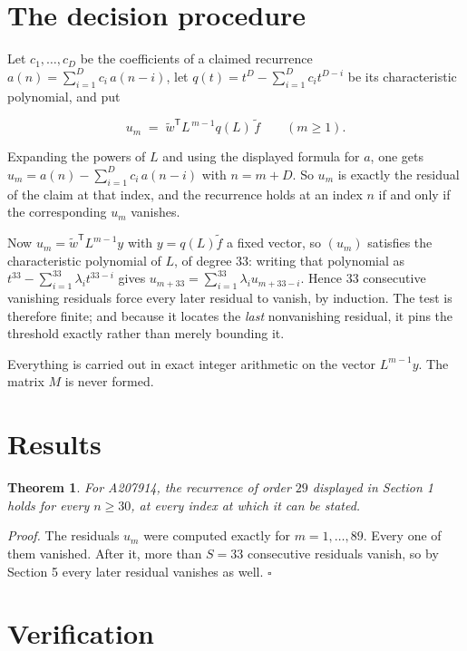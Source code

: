 \documentclass[11pt]{article}
\newtheorem{theorem}{Theorem}
\theoremstyle{definition}
\begin{document}
\section{The decision procedure}

Let $c_1,\dots,c_D$ be the coefficients of a claimed recurrence $a(n) = \sum_{i=1}^{D} c_i\,a(n-i)$, let $q(t) = t^{D} - \sum_{i=1}^{D} c_i t^{D-i}$ be its characteristic polynomial, and put

\[u_m \;=\; \tilde w^{\mathsf T} L^{\,m-1} q(L)\,\tilde f \qquad (m \ge 1).\]

Expanding the powers of $L$ and using the displayed formula for $a$, one gets $u_m = a(n) - \sum_{i=1}^{D} c_i\,a(n-i)$ with $n = m + D$. So $u_m$ is exactly the residual of the claim at that index, and the recurrence holds at an index $n$ if and only if the corresponding $u_m$ vanishes.

Now $u_m = \tilde w^{\mathsf T} L^{m-1} y$ with $y = q(L)\tilde f$ a fixed vector, so $(u_m)$ satisfies the characteristic polynomial of $L$, of degree $33$: writing that polynomial as $t^{33} - \sum_{i=1}^{33} \lambda_i t^{33-i}$ gives $u_{m+33} = \sum_{i=1}^{33} \lambda_i u_{m+33-i}$. Hence $33$ consecutive vanishing residuals force every later residual to vanish, by induction. The test is therefore finite; and because it locates the {\itshape last} nonvanishing residual, it pins the threshold exactly rather than merely bounding it.

Everything is carried out in exact integer arithmetic on the vector $L^{m-1}y$. The matrix $M$ is never formed.

\section{Results}

\begin{theorem} For A207914, the recurrence of order $29$ displayed in Section 1 holds for every $n \ge 30$, at every index at which it can be stated.\end{theorem}

{\itshape Proof.} The residuals $u_m$ were computed exactly for $m = 1,\dots,89$. Every one of them vanished. After it, more than $S = 33$ consecutive residuals vanish, so by Section 5 every later residual vanishes as well. $\square$

\section{Verification}
\end{document}
